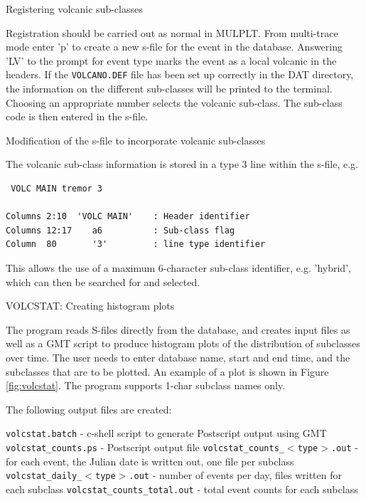 Registering volcanic sub-classes 

Registration should be carried out as normal in MULPLT. From multi-trace mode enter 'p' to create a new s-file for the event in the database. Answering 'LV' to the prompt for event type marks the event as a local volcanic in the headers. If the \texttt{VOLCANO.DEF} file has been set up correctly in the DAT directory, the information on the different sub-classes will be printed to the terminal. Choosing an appropriate number selects the volcanic sub-class. The sub-class code is then entered in the s-file. 

Modification of the s-file to incorporate volcanic sub-classes 

The volcanic sub-class information is stored in a type 3 line within the s-file, e.g. 

\begin{verbatim}
 VOLC MAIN tremor 3 

Columns 2:10  'VOLC MAIN'    : Header identifier 
Columns 12:17    a6          : Sub-class flag
Column  80       '3'         : line type identifier 
\end{verbatim}

This allows the use of a maximum 6-character sub-class identifier, e.g. 'hybrid', which can then be searched for and selected. 

VOLCSTAT: Creating histogram plots 

The program reads S-files directly from the database, and creates 
input files as well as a GMT script to produce histogram 
plots of the distribution of subclasses over time. The user needs 
to enter database name, start and end time, and the subclasses that 
are to be plotted. 
An example of a plot is shown in Figure 
\ref{fig:volcstat}.
The program supports 1-char subclass names only.

The following output files are created:

\texttt{volcstat.batch} - c-shell script to generate Postscript output using GMT	\newline
\texttt{volcstat\_counts.ps} - Postscript output file\newline
\texttt{volcstat\_counts\_$<$type$>$.out} - for each event, the Julian date is written out, one file per subclass\newline
\texttt{volcstat\_daily\_$<$type$>$.out} - number of events per day, files written for each subclass\newline
\texttt{volcstat\_counts\_total.out} - total event counts for each subclass\newline


